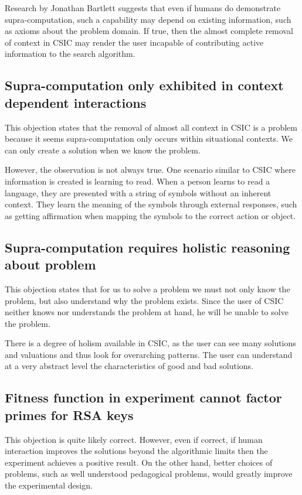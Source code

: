 Research by Jonathan Bartlett \cite{bartlett11:_using_turin_oracl_in_cognit_model} suggests that even if humans do demonstrate supra-computation, such a capability may depend on existing information, such as axioms about the problem domain.  If true, then the almost complete removal of context in CSIC may render the user incapable of contributing active information to the search algorithm.

\subsection{Supra-computation only exhibited in context dependent interactions}

This objection states that the removal of almost all context in CSIC is a problem because it seems supra-computation only occurs within situational contexts.  We can only create a solution when we know the problem.

However, the observation is not always true.  One scenario similar to CSIC where information is created is learning to read.  When a person learns to read a language, they are presented with a string of symbols without an inherent context.  They learn the meaning of the symbols through external responses, such as getting affirmation when mapping the symbols to the correct action or object.

\subsection{Supra-computation requires holistic reasoning about problem}

This objection states that for us to solve a problem we must not only know the problem, but also understand why the problem exists. Since the user of CSIC neither knows nor understands the problem at hand, he will be unable to solve the problem.

There is a degree of holism available in CSIC, as the user can see many solutions and valuations and thus look for overarching patterns. The user can understand at a very abstract level the characteristics of good and bad solutions.

\subsection{Fitness function in experiment cannot factor primes for RSA keys} 

This objection is quite likely correct.  However, even if correct, if human interaction improves the solutions beyond the algorithmic limits then the experiment achieves a positive result.  On the other hand, better choices of problems, such as well understood pedagogical problems, would greatly improve the experimental design.  

